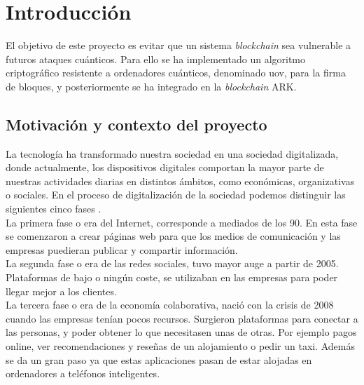 \chapter{Introducción}

El objetivo de este proyecto es evitar que un sistema \textit{blockchain} sea vulnerable a futuros ataques cuánticos. Para ello se ha implementado un algoritmo criptográfico resistente a ordenadores cuánticos, denominado \acrshort{uov}, para la firma de bloques, y posteriormente se ha integrado en la \textit{blockchain} ARK.

\section{Motivación y contexto del proyecto}
\label{sec:intro:motivacion} %


La tecnología ha transformado nuestra sociedad en una sociedad digitalizada, donde actualmente, los dispositivos digitales comportan la mayor parte de nuestras actividades diarias en distintos ámbitos, como económicas, organizativas o sociales. En el proceso de digitalización de la sociedad podemos distinguir las siguientes cinco fases \cite{fases-digitalizacion}.\\

La primera fase o era del Internet, corresponde a mediados de los 90. En esta fase se comenzaron a crear páginas web para que los medios de comunicación y las empresas puedieran publicar y compartir información.\\

La segunda fase o era de las redes sociales, tuvo mayor auge a partir de 2005. Plataformas de bajo o ningún coste, se utilizaban en las empresas para poder llegar mejor a los clientes.\\

La tercera fase o era de la economía colaborativa, nació con la crisis de  2008 cuando las empresas tenían pocos recursos. Surgieron plataformas para conectar a las personas, y poder obtener lo que necesitasen unas de otras. Por ejemplo pagos online, ver recomendaciones y reseñas de un alojamiento o pedir un taxi. Además se da un gran paso ya que estas aplicaciones pasan de estar  alojadas en ordenadores a teléfonos inteligentes.\\

